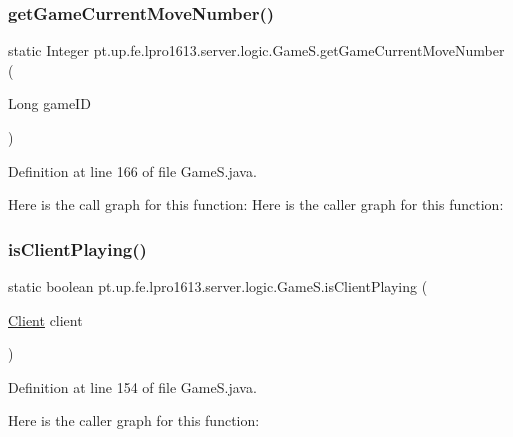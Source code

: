 \subsubsection{\texorpdfstring{get\+Game\+Current\+Move\+Number()}{getGameCurrentMoveNumber()}}
{\footnotesize\ttfamily static Integer pt.\+up.\+fe.\+lpro1613.\+server.\+logic.\+Game\+S.\+get\+Game\+Current\+Move\+Number (\begin{DoxyParamCaption}\item[{Long}]{game\+ID }\end{DoxyParamCaption})\hspace{0.3cm}{\ttfamily [static]}}



Definition at line 166 of file Game\+S.\+java.

Here is the call graph for this function\+:
Here is the caller graph for this function\+:
\hypertarget{classpt_1_1up_1_1fe_1_1lpro1613_1_1server_1_1logic_1_1_game_s_a51c1a3bbb8f87d4ce6c3658591440209}{}\label{classpt_1_1up_1_1fe_1_1lpro1613_1_1server_1_1logic_1_1_game_s_a51c1a3bbb8f87d4ce6c3658591440209} 
\subsubsection{\texorpdfstring{is\+Client\+Playing()}{isClientPlaying()}}
{\footnotesize\ttfamily static boolean pt.\+up.\+fe.\+lpro1613.\+server.\+logic.\+Game\+S.\+is\+Client\+Playing (\begin{DoxyParamCaption}\item[{\hyperlink{classpt_1_1up_1_1fe_1_1lpro1613_1_1server_1_1conn_1_1_client}{Client}}]{client }\end{DoxyParamCaption})\hspace{0.3cm}{\ttfamily [static]}}



Definition at line 154 of file Game\+S.\+java.

Here is the caller graph for this function\+:
\hypertarget{classpt_1_1up_1_1fe_1_1lpro1613_1_1server_1_1logic_1_1_game_s_a12cbc3d6a25318c576d797b31f67ca16}{}\label{classpt_1_1up_1_1fe_1_1lpro1613_1_1server_1_1logic_1_1_game_s_a12cbc3d6a25318c576d797b31f67ca16} 
